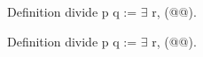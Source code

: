   Definition divide p q :=
    $\exists$ r, (@@).

  Definition divide p q :=
    $\exists$ r, (@@).
